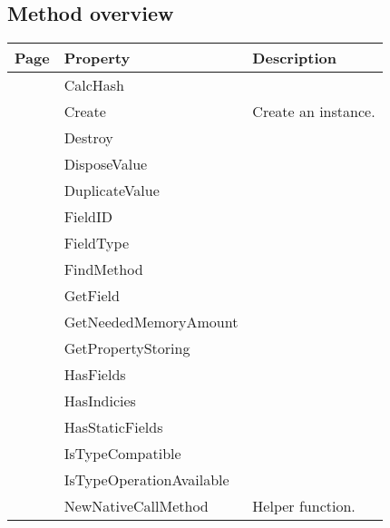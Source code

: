 \subsection{Method overview}
\label{thoriumcorepkg:thorium:tthoriumrttiobjecttype:methods}
\begin{tabularx}{\textwidth}{llX}
Page & Property & Description  \\ \hline
\pageref{thoriumcorepkg:thorium:tthoriumrttiobjecttype:calchash} & CalcHash  &  \\
\pageref{thoriumcorepkg:thorium:tthoriumrttiobjecttype:create} & Create  & Create an instance. \\
\pageref{thoriumcorepkg:thorium:tthoriumrttiobjecttype:destroy} & Destroy  &  \\
\pageref{thoriumcorepkg:thorium:tthoriumrttiobjecttype:disposevalue} & DisposeValue  &  \\
\pageref{thoriumcorepkg:thorium:tthoriumrttiobjecttype:duplicatevalue} & DuplicateValue  &  \\
\pageref{thoriumcorepkg:thorium:tthoriumrttiobjecttype:fieldid} & FieldID  &  \\
\pageref{thoriumcorepkg:thorium:tthoriumrttiobjecttype:fieldtype} & FieldType  &  \\
\pageref{thoriumcorepkg:thorium:tthoriumrttiobjecttype:findmethod} & FindMethod  &  \\
\pageref{thoriumcorepkg:thorium:tthoriumrttiobjecttype:getfield} & GetField  &  \\
\pageref{thoriumcorepkg:thorium:tthoriumrttiobjecttype:getneededmemoryamount} & GetNeededMemoryAmount  &  \\
\pageref{thoriumcorepkg:thorium:tthoriumrttiobjecttype:getpropertystoring} & GetPropertyStoring  &  \\
\pageref{thoriumcorepkg:thorium:tthoriumrttiobjecttype:hasfields} & HasFields  &  \\
\pageref{thoriumcorepkg:thorium:tthoriumrttiobjecttype:hasindicies} & HasIndicies  &  \\
\pageref{thoriumcorepkg:thorium:tthoriumrttiobjecttype:hasstaticfields} & HasStaticFields  &  \\
\pageref{thoriumcorepkg:thorium:tthoriumrttiobjecttype:istypecompatible} & IsTypeCompatible  &  \\
\pageref{thoriumcorepkg:thorium:tthoriumrttiobjecttype:istypeoperationavailable} & IsTypeOperationAvailable  &  \\
\pageref{thoriumcorepkg:thorium:tthoriumrttiobjecttype:newnativecallmethod} & NewNativeCallMethod  & Helper function. \\

\end{tabularx}
